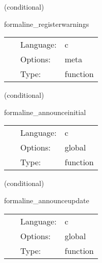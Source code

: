 \vspace{5mm}

   (conditional) 

\hspace{5mm} formaline\_registerwarnings 

\hspace{5mm}{\it register to receive warnings and info messages from the flesh } 


\hspace{5mm}

 \begin{tabular*}{160mm}{cll} 
~ & Language:  & c \\ 
~ & Options:  & meta \\ 
~ & Type:  & function \\ 
\end{tabular*} 


\vspace{5mm}

   (conditional) 

\hspace{5mm} formaline\_announceinitial 

\hspace{5mm}{\it put some meta information about the current run into permanent storage } 


\hspace{5mm}

 \begin{tabular*}{160mm}{cll} 
~ & Language:  & c \\ 
~ & Options:  & global \\ 
~ & Type:  & function \\ 
\end{tabular*} 


\vspace{5mm}

   (conditional) 

\hspace{5mm} formaline\_announceupdate 

\hspace{5mm}{\it put some meta information about the current run into permanent storage } 


\hspace{5mm}

 \begin{tabular*}{160mm}{cll} 
~ & Language:  & c \\ 
~ & Options:  & global \\ 
~ & Type:  & function \\ 
\end{tabular*} 


